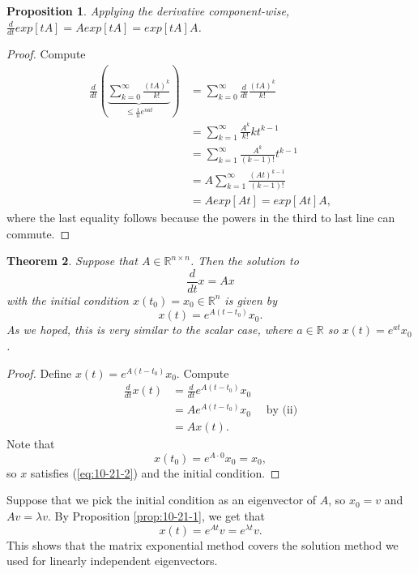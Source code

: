 \documentclass{tufte-handout}
\newcommand*\R{\mathbb{R}}
\newtheorem{thm}{Theorem}[subsection]
\newtheorem{prop}[thm]{Proposition}
\theoremstyle{definition}
\begin{document}
\begin{prop}
	Applying the derivative component-wise, $\frac{d}{dt} exp[tA] = A exp[tA] = exp[tA] A$.
\end{prop}
\begin{proof}
	Compute
	\begin{align*}
		\frac{d}{dt} \left( \underbrace{\sum\limits_{k=0}^{\infty} \frac{\left( tA \right)^{k}}{k!}}_{\le \frac{1}{n} e^{n a t}} \right) &= \sum\limits_{k=0}^{\infty} \frac{d}{dt} \frac{\left( tA \right)^{k}}{k!} \\
														  &= \sum\limits_{k=1}^{\infty} \frac{A^k}{k!} k t^{k-1} \\
														  &= \sum\limits_{k=1}^{\infty} \frac{A^{k}}{\left( k-1 \right)!} t^{k-1} \\
														  &= A \sum\limits_{k=1}^{\infty} \frac{\left( At \right)^{k-1}}{\left( k-1 \right)!} \\
														  &= A exp[At] = exp[At] A
	,\end{align*}
	where the last equality follows because the powers in the third to last line can commute.
\end{proof}

\begin{thm}
	Suppose that $A \in \R^{n\times n}$. Then the solution to
	\begin{equation}
		\frac{d}{dt}x = Ax \label{eq:10-21-2}
	\end{equation}
	with the initial condition $x(t_0) = x_0 \in \R^n$ is given by \[
		x(t) = e^{A (t-t_0)}x_0
	.\] As we hoped, this is very similar to the scalar case, where $a \in \R$ so $x(t) = e^{at}x_0$.
\end{thm}

\begin{proof}
	Define $x(t) = e^{A(t-t_0)}x_0$. Compute
	\begin{align*}
		\frac{d}{dt}x(t) &= \frac{d}{dt} e^{A(t-t_0)}x_0 \\
		&= A e^{A(t-t_0)}x_0 \quad \text{ by (ii)} \\
		&= A x(t)
	.\end{align*}
	Note that \[
		x(t_0) = e^{A \cdot 0}x_0 = x_0
	,\] so $x$ satisfies (\ref{eq:10-21-2}) and the initial condition. 
\end{proof}

Suppose that we pick the initial condition as an eigenvector of $A$, so $x_0 = v$ and $Av= \lambda v$. By Proposition \ref{prop:10-21-1}, we get that \[
	x(t) = e^{At}v = e^{\lambda t}v
.\] This shows that the matrix exponential method covers the solution method we used for linearly independent eigenvectors.
\end{document}
